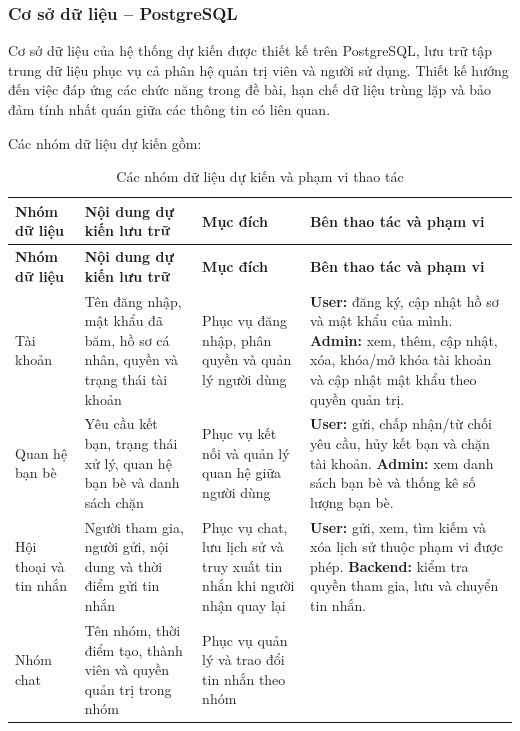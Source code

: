 \subsubsection{Cơ sở dữ liệu -- PostgreSQL}
\label{subsubsec:co-so-du-lieu-postgresql}

Cơ sở dữ liệu của hệ thống dự kiến được thiết kế trên PostgreSQL, lưu trữ
tập trung dữ liệu phục vụ cả phân hệ quản trị viên và người sử dụng.
Thiết kế hướng đến việc đáp ứng các chức năng trong đề bài, hạn chế dữ liệu
trùng lặp và bảo đảm tính nhất quán giữa các thông tin có liên quan.

Các nhóm dữ liệu dự kiến gồm:

\begingroup
\small
\setlength{\tabcolsep}{4pt}
\begin{longtable}{|L{2cm}|L{4cm}|L{3cm}|L{\dimexpr\textwidth-9cm-8\arrayrulewidth\relax}|}
  \caption{Các nhóm dữ liệu dự kiến và phạm vi thao tác}
  \label{tab:nhom-du-lieu-va-pham-vi}\\
  \hline
  \textbf{Nhóm dữ liệu} & \textbf{Nội dung dự kiến lưu trữ} &
  \textbf{Mục đích} & \textbf{Bên thao tác và phạm vi}\\
  \hline
  \endfirsthead
  \hline
  \textbf{Nhóm dữ liệu} & \textbf{Nội dung dự kiến lưu trữ} &
  \textbf{Mục đích} & \textbf{Bên thao tác và phạm vi}\\
  \hline
  \endhead
  Tài khoản &
  Tên đăng nhập, mật khẩu đã băm, hồ sơ cá nhân, quyền và trạng thái tài khoản &
  Phục vụ đăng nhập, phân quyền và quản lý người dùng &
  \textbf{User:} đăng ký, cập nhật hồ sơ và mật khẩu của mình.
  \textbf{Admin:} xem, thêm, cập nhật, xóa, khóa/mở khóa tài khoản và cập nhật
  mật khẩu theo quyền quản trị.\\
  \hline
  Quan hệ bạn bè &
  Yêu cầu kết bạn, trạng thái xử lý, quan hệ bạn bè và danh sách chặn &
  Phục vụ kết nối và quản lý quan hệ giữa người dùng &
  \textbf{User:} gửi, chấp nhận/từ chối yêu cầu, hủy kết bạn và chặn tài khoản.
  \textbf{Admin:} xem danh sách bạn bè và thống kê số lượng bạn bè.\\
  \hline
  Hội thoại và tin nhắn &
  Người tham gia, người gửi, nội dung và thời điểm gửi tin nhắn &
  Phục vụ chat, lưu lịch sử và truy xuất tin nhắn khi người nhận quay lại &
  \textbf{User:} gửi, xem, tìm kiếm và xóa lịch sử thuộc phạm vi được phép.
  \textbf{Backend:} kiểm tra quyền tham gia, lưu và chuyển tin nhắn.\\
  \hline
  Nhóm chat &
  Tên nhóm, thời điểm tạo, thành viên và quyền quản trị trong nhóm &
  Phục vụ quản lý và trao đổi tin nhắn theo nhóm &

\end{longtable}

